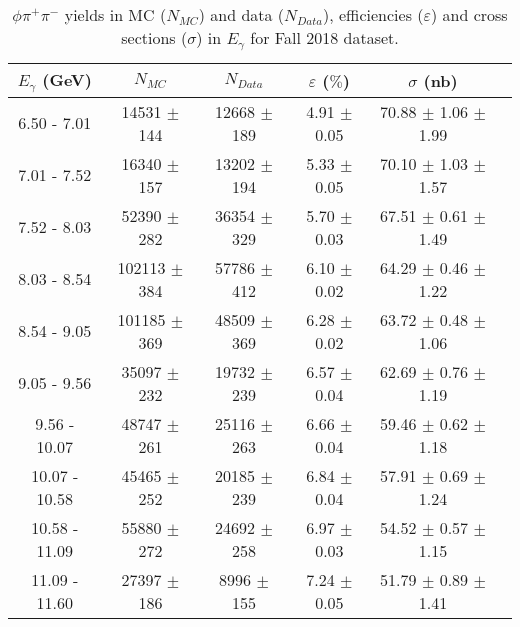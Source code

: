 \begin{center}
\begin{table}[H]
    \centering
    \caption{$\phi \pi^{+}\pi^{-}$ yields in MC ($N_{MC}$) and data ($N_{Data}$), efficiencies ($\varepsilon$) and cross sections ($\sigma$) in $E_{\gamma}$ for Fall 2018 dataset.}
    \label{tab.y2175.xsec_ul.phi2pi.4.1}
    \begin{tabular}{|c|c|c|c|c|c|}
    \hline
    $E_{\gamma}$ (GeV) & $N_{MC}$ & $N_{Data}$ & $\varepsilon$ ($\%$) & $\sigma$ (nb) \\ 
    \hline
    6.50 - 7.01 & 14531 $\pm$ 144 & 12668 $\pm$ 189 & 4.91 $\pm$ 0.05 & 70.88 $\pm$ 1.06 $\pm$ 1.99 \\ 
    7.01 - 7.52 & 16340 $\pm$ 157 & 13202 $\pm$ 194 & 5.33 $\pm$ 0.05 & 70.10 $\pm$ 1.03 $\pm$ 1.57 \\ 
    7.52 - 8.03 & 52390 $\pm$ 282 & 36354 $\pm$ 329 & 5.70 $\pm$ 0.03 & 67.51 $\pm$ 0.61 $\pm$ 1.49 \\ 
    8.03 - 8.54 & 102113 $\pm$ 384 & 57786 $\pm$ 412 & 6.10 $\pm$ 0.02 & 64.29 $\pm$ 0.46 $\pm$ 1.22 \\ 
    8.54 - 9.05 & 101185 $\pm$ 369 & 48509 $\pm$ 369 & 6.28 $\pm$ 0.02 & 63.72 $\pm$ 0.48 $\pm$ 1.06 \\ 
    9.05 - 9.56 & 35097 $\pm$ 232 & 19732 $\pm$ 239 & 6.57 $\pm$ 0.04 & 62.69 $\pm$ 0.76 $\pm$ 1.19 \\ 
    9.56 - 10.07 & 48747 $\pm$ 261 & 25116 $\pm$ 263 & 6.66 $\pm$ 0.04 & 59.46 $\pm$ 0.62 $\pm$ 1.18 \\ 
    10.07 - 10.58 & 45465 $\pm$ 252 & 20185 $\pm$ 239 & 6.84 $\pm$ 0.04 & 57.91 $\pm$ 0.69 $\pm$ 1.24 \\ 
    10.58 - 11.09 & 55880 $\pm$ 272 & 24692 $\pm$ 258 & 6.97 $\pm$ 0.03 & 54.52 $\pm$ 0.57 $\pm$ 1.15 \\ 
    11.09 - 11.60 & 27397 $\pm$ 186 & 8996 $\pm$ 155 & 7.24 $\pm$ 0.05 & 51.79 $\pm$ 0.89 $\pm$ 1.41 \\ 
   \hline
\end{tabular}
\end{table}
\end{center}

